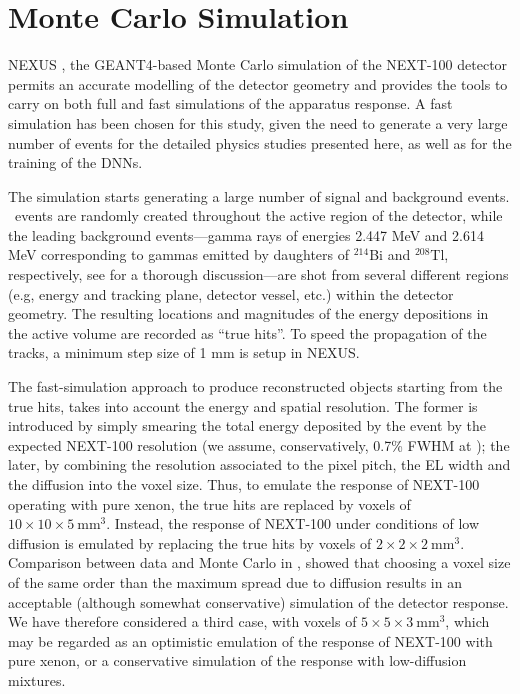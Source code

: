 \documentclass[a4paper,11pt]{article}
\begin{document}
\section{Monte Carlo Simulation}
\label{sec.MC}

NEXUS \cite{MartinAlbo_thesis}, the  GEANT4-based \cite{GEANT4} 
Monte Carlo simulation of the NEXT-100 detector permits an accurate modelling of the detector geometry and provides the tools to carry on both full and fast simulations of the apparatus response. 
A fast simulation has been chosen for this study, 
given the need to generate a very large number of events for the detailed physics studies presented here, as well as for the training of the DNNs.

The simulation starts generating a large number of signal and background events. \bbonu\ events are randomly created throughout the active region of the detector, while the leading background events---gamma rays of energies 2.447 MeV and 2.614 MeV corresponding to gammas emitted by daughters of $^{214}$Bi and $^{208}$Tl,
respectively, see \cite{Martin-Albo:2015rhw} for a thorough discussion---are shot from several different regions (e.g, energy and tracking plane, detector vessel, etc.) within the detector geometry. 
The resulting locations and magnitudes of the energy depositions in the active volume are recorded as ``true hits''. To speed the propagation of the tracks, a minimum step size of 1 mm is setup in NEXUS.

The fast-simulation approach to produce reconstructed objects starting from the true hits, takes into account the energy and spatial resolution. The former is introduced by simply smearing the total energy deposited by the event by the expected NEXT-100 resolution (we assume, conservatively, 0.7\% FWHM at \Qbb); the later, by combining the resolution associated to the
pixel pitch, the EL width and the diffusion into the voxel size. Thus, to emulate the response of NEXT-100 operating with pure xenon, the true hits are replaced by voxels of $10 \times 10 \times 5 \mathrm{~mm^3}$. Instead, the response of NEXT-100 under conditions of low diffusion is emulated by replacing the true hits by voxels of $2 \times 2 \times 2 \mathrm{~mm^3}$. Comparison between data and Monte Carlo in  \cite{NEXT_topology}, showed that choosing a voxel size of the same order than the maximum spread due to diffusion results in an acceptable (although somewhat conservative) simulation of the detector response. We have therefore considered a third case, with voxels of $5 \times 5 \times 3 \mathrm{~mm^3}$, which may be regarded as an optimistic emulation of the response of NEXT-100 with pure xenon, or a conservative simulation of the response with low-diffusion mixtures. 
\end{document}
